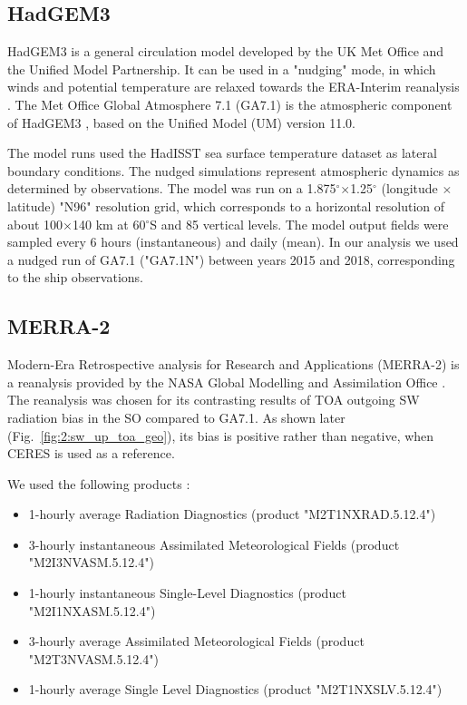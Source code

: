 \subsection{HadGEM3}
\label{sec:2:hadgem3}
HadGEM3 \citep{walters2017} is a general circulation model developed by the UK
Met Office and the Unified Model Partnership.
It can be used in a "nudging" \citep{telford2008} mode, in which winds and
potential temperature are relaxed towards the ERA-Interim reanalysis
\citep{dee2011}. The Met Office Global Atmosphere 7.1 (GA7.1) is the atmospheric
component of HadGEM3 \citep{walters2017}, based on the Unified Model (UM)
version 11.0.

The model runs used the HadISST sea surface temperature dataset
\citep{rayner2003} as lateral boundary conditions. The nudged simulations
represent atmospheric dynamics as determined by observations. The model was run
on a 1.875$^\circ$$\times$1.25$^\circ$ (longitude $\times$ latitude) "N96"
resolution grid, which corresponds to a horizontal resolution of about
100$\times$140 \unit{km} at 60$^\circ$S and 85 vertical levels. The model output
fields were sampled every 6 hours (instantaneous) and daily (mean). In our
analysis we used a nudged run of GA7.1 ("GA7.1N") between years 2015 and 2018,
corresponding to the ship observations.

\subsection{MERRA-2}
\label{sec:2:merra-2}

Modern-Era Retrospective analysis for Research and Applications (MERRA-2) is a
reanalysis provided by the NASA Global Modelling and Assimilation Office
\citep{gelaro2017}. The reanalysis was chosen for its contrasting results of
TOA outgoing SW radiation bias in the SO compared to GA7.1. As shown later
(Fig.~\ref{fig:2:sw_up_toa_geo}), its bias is positive rather than negative,
when CERES is used as a reference.

We used the following products \citep{bosilovich2015}:

\begin{itemize}
\item 1-hourly average Radiation Diagnostics (product "M2T1NXRAD.5.12.4")
\item 3-hourly instantaneous Assimilated Meteorological Fields (product
"M2I3NVASM.5.12.4")
\item 1-hourly instantaneous Single-Level Diagnostics (product
"M2I1NXASM.5.12.4")
\item 3-hourly average Assimilated Meteorological Fields (product
"M2T3NVASM.5.12.4")
\item 1-hourly average Single Level Diagnostics (product "M2T1NXSLV.5.12.4")
\end{itemize}

